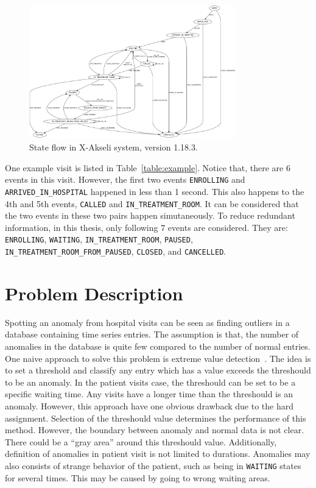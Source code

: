 \begin{figure}
	\begin{center}
		\includegraphics[width=0.8\textwidth]{images/patientFsm}
		\caption{State flow in X-Akseli system, version 1.18.3.}
		\label{fig:state}
	\end{center}
\end{figure}

One example visit is listed in Table~\ref{table:example}. Notice that, there are 6 events in this visit. However, the first two events \texttt{ENROLLING} and  \texttt{ARRIVED\_IN\_HOSPITAL} happened in less than 1 second. This also happens to the 4th and 5th events, \texttt{CALLED} and \texttt{IN\_TREATMENT\_ROOM}. It can be considered that the two events in these two pairs happen simutaneously. To reduce redundant information, in this thesis, only following 7 events are considered. They are: \texttt{ENROLLING}, \texttt{WAITING}, \texttt{IN\_TREATMENT\_ROOM}, \texttt{PAUSED}, \texttt{IN\_TREATMENT\_ROOM\_FROM\_PAUSED}, \texttt{CLOSED}, and \texttt{CANCELLED}.

\section{Problem Description}
Spotting an anomaly from hospital visits can be seen as finding outliers in a database containing time series entries. The assumption is that, the number of anomalies in the database is quite few compared to the number of normal entries. One naive approach to solve this problem is extreme value detection~\cite{aggarwal2013introduction}. The idea is to set a threshold and classify any entry which has a value exceeds the threshould to be an anomaly. In the patient visits case, the threshould can be set to be a specific waiting time. Any visits have a longer time than the threshould is an anomaly. However, this approach have one obvious drawback due to the hard assignment. Selection of the threshould value determines the performance of this method. However, the boundary between anomaly and normal data is not clear. There could be a ``gray area'' around this threshould value. Additionally, definition of anomalies in patient visit is not limited to durations. Anomalies may also consists of strange behavior of the patient, such as being in \texttt{WAITING} states for several times. This may be caused by going to wrong waiting areas.

